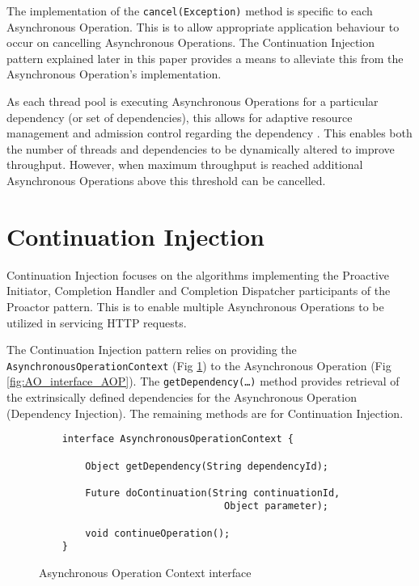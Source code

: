 \documentclass[prodmode]{style/acmlarge}
\begin{document}
The implementation of the \texttt{cancel(Exception)} method is specific to each
Asynchronous Operation.  This is to allow appropriate application behaviour to
occur on cancelling Asynchronous Operations.  The Continuation Injection pattern
explained later in this paper provides a means to alleviate this from the
Asynchronous Operation's implementation.

As each thread pool is executing Asynchronous Operations for a particular
dependency (or set of dependencies), this allows for adaptive resource
management and admission control regarding the dependency \cite{seda}.  This
enables both the number of threads and dependencies to be dynamically altered to
improve throughput.  However, when maximum throughput is reached additional
Asynchronous Operations above this threshold can be cancelled.


\section{Continuation Injection}

Continuation Injection focuses on the algorithms implementing the Proactive
Initiator, Completion Handler and Completion Dispatcher participants of the
Proactor pattern.  This is to enable multiple Asynchronous Operations to be
utilized in servicing HTTP requests.

The Continuation Injection pattern relies on providing the
\texttt{AsynchronousOperationContext} (Fig \ref{fig:AOC_interface}) to the
Asynchronous Operation (Fig \ref{fig:AO_interface_AOP}).  The
\texttt{getDependency(\ldots)} method provides retrieval of the extrinsically
defined dependencies for the Asynchronous Operation (Dependency Injection).  The
remaining methods are for Continuation Injection.

\begin{figure}[tp]
\centering
\begin{verbatim}
    interface AsynchronousOperationContext {
    
        Object getDependency(String dependencyId);
        
        Future doContinuation(String continuationId, 
                                Object parameter);
        
        void continueOperation();
    }
\end{verbatim}
\caption{Asynchronous Operation Context interface\footnotemark}
\label{fig:AOC_interface}
\end{figure}
\end{document}

